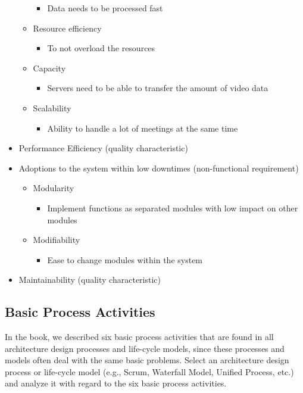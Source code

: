 \documentclass{article}
\begin{document}
\begin{itemize}
\begin{itemize}
\begin{itemize}
                        \item Data needs to be processed fast
                    \end{itemize}
              \item Resource efficiency
                    \begin{itemize}
                        \item To not overload the resources
                    \end{itemize}
              \item Capacity
                    \begin{itemize}
                        \item Servers need to be able to transfer the amount of video data
                    \end{itemize}
              \item Scalability
                    \begin{itemize}
                        \item Ability to handle a lot of meetings at the same time
                    \end{itemize}
          \end{itemize}
    \item Performance Efficiency (quality characteristic)
    \item Adoptions to the system within low downtimes (non-functional requirement)
          \begin{itemize}
              \item Modularity
                    \begin{itemize}
                        \item Implement functions as separated modules with low impact on other modules
                    \end{itemize}
              \item Modifiability
                    \begin{itemize}
                        \item Ease to change modules within the system
                    \end{itemize}
          \end{itemize}
    \item Maintainability (quality characteristic)
\end{itemize}

\subsection{Basic Process Activities}
In the book, we described six basic process activities that are found in all architecture design processes and life-cycle models, since these processes and models often deal with the same basic problems. Select an architecture design process or life-cycle model (e.g., Scrum, Waterfall Model, Unified Process, etc.) and analyze it with regard to the six basic process activities.
\end{document}
